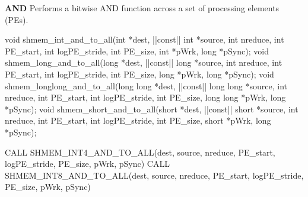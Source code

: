 
\begin{apidefinition}

\textbf{AND} \newline
Performs a bitwise AND function across a set of processing elements (\ac{PE}s).\newline
\begin{Csynopsis}
void shmem_int_and_to_all(int *dest, |\aftergroup{}|const|\aftergroup\prevcolor| int *source, int nreduce, int PE_start, int logPE_stride, int PE_size, int *pWrk, long *pSync);
void shmem_long_and_to_all(long *dest, |\aftergroup{}|const|\aftergroup\prevcolor| long *source, int nreduce, int PE_start, int logPE_stride, int PE_size, long *pWrk, long *pSync);
void shmem_longlong_and_to_all(long long *dest, |\aftergroup{}|const|\aftergroup\prevcolor| long long *source, int nreduce, int PE_start, int logPE_stride, int PE_size, long long *pWrk, long *pSync);
void shmem_short_and_to_all(short *dest, |\aftergroup{}|const|\aftergroup\prevcolor| short *source, int nreduce, int PE_start, int logPE_stride, int PE_size, short *pWrk, long *pSync);
\end{Csynopsis}

\begin{Fsynopsis}
CALL SHMEM_INT4_AND_TO_ALL(dest, source, nreduce, PE_start, logPE_stride, PE_size, pWrk, pSync)
CALL SHMEM_INT8_AND_TO_ALL(dest, source, nreduce, PE_start, logPE_stride, PE_size, pWrk, pSync)
\end{Fsynopsis}


\end{apidefinition}
